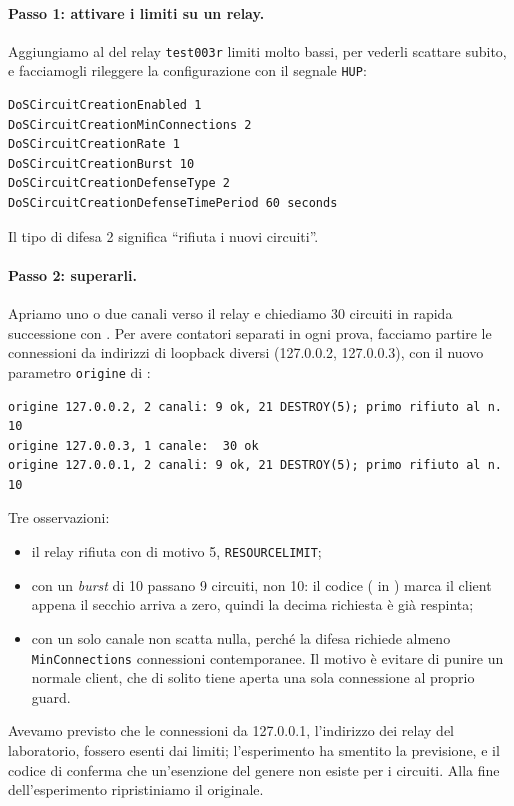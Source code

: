 \paragraph{Passo 1: attivare i limiti su un relay.} Aggiungiamo al  del relay \texttt{test003r} limiti molto bassi, per vederli scattare subito, e facciamogli rileggere la configurazione con il segnale \texttt{HUP}:
\begin{lstlisting}[language=torrc,numbers=none]
DoSCircuitCreationEnabled 1
DoSCircuitCreationMinConnections 2
DoSCircuitCreationRate 1
DoSCircuitCreationBurst 10
DoSCircuitCreationDefenseType 2
DoSCircuitCreationDefenseTimePeriod 60 seconds
\end{lstlisting}
Il tipo di difesa 2 significa \enquote{rifiuta i nuovi circuiti}.

\paragraph{Passo 2: superarli.} Apriamo uno o due canali verso il relay e chiediamo 30 circuiti in rapida successione con . Per avere contatori separati in ogni prova, facciamo partire le connessioni da indirizzi di loopback diversi (127.0.0.2, 127.0.0.3), con il nuovo parametro \texttt{origine} di :
\begin{lstlisting}[numbers=none]
origine 127.0.0.2, 2 canali: 9 ok, 21 DESTROY(5); primo rifiuto al n. 10
origine 127.0.0.3, 1 canale:  30 ok
origine 127.0.0.1, 2 canali: 9 ok, 21 DESTROY(5); primo rifiuto al n. 10
\end{lstlisting}
Tre osservazioni:
\begin{itemize}
  \item il relay rifiuta con  di motivo 5, \texttt{RESOURCELIMIT};
  \item con un \emph{burst} di 10 passano 9 circuiti, non 10: il codice ( in ) marca il client appena il secchio arriva a zero, quindi la decima richiesta è già respinta;
  \item con un solo canale non scatta nulla, perché la difesa richiede almeno \texttt{MinConnections} connessioni contemporanee. Il motivo è evitare di punire un normale client, che di solito tiene aperta una sola connessione al proprio guard.
\end{itemize}
Avevamo previsto che le connessioni da 127.0.0.1, l'indirizzo dei relay del laboratorio, fossero esenti dai limiti; l'esperimento ha smentito la previsione, e il codice di  conferma che un'esenzione del genere non esiste per i circuiti. Alla fine dell'esperimento ripristiniamo il  originale.

